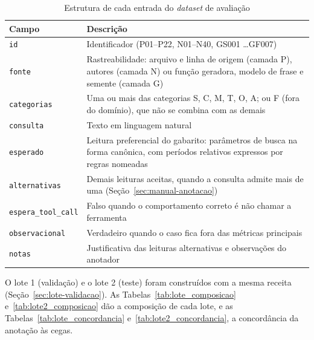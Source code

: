 \begin{table}[htbp!]
\centering
\caption{Estrutura de cada entrada do \textit{dataset} de avaliação}
\label{tab:estrutura-dataset}
\small
\begin{tabular}{|l|p{10.5cm}|}
\hline
\textbf{Campo} & \textbf{Descrição} \\
\hline
\texttt{id} & Identificador (P01--P22, N01--N40, GS001 \ldots GF007) \\ \hline
\texttt{fonte} & Rastreabilidade: arquivo e linha de origem (camada P), autores (camada N) ou função geradora, modelo de frase e semente (camada G) \\ \hline
\texttt{categorias} & Uma ou mais das categorias S, C, M, T, O, A; ou F (fora do domínio), que não se combina com as demais \\ \hline
\texttt{consulta} & Texto em linguagem natural \\ \hline
\texttt{esperado} & Leitura preferencial do gabarito: parâmetros de busca na forma canônica, com períodos relativos expressos por regras nomeadas \\ \hline
\texttt{alternativas} & Demais leituras aceitas, quando a consulta admite mais de uma (Seção~\ref{sec:manual-anotacao}) \\ \hline
\texttt{espera\_tool\_call} & Falso quando o comportamento correto é não chamar a ferramenta \\ \hline
\texttt{observacional} & Verdadeiro quando o caso fica fora das métricas principais \\ \hline
\texttt{notas} & Justificativa das leituras alternativas e observações do anotador \\ \hline
\end{tabular}%
\end{table}





O lote 1 (validação) e o lote 2 (teste) foram construídos com a mesma receita (Seção~\ref{sec:lote-validacao}). As Tabelas~\ref{tab:lote_composicao} e~\ref{tab:lote2_composicao} dão a composição de cada lote, e as Tabelas~\ref{tab:lote_concordancia} e~\ref{tab:lote2_concordancia}, a concordância da anotação às cegas.







